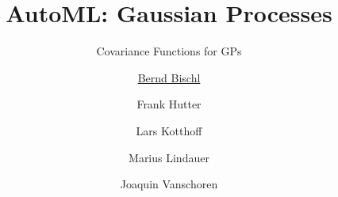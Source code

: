 



\newcommand{\lz}{\vspace{0.5cm}}
\newcommand{\thetab}{\bm{\weights}}
\newcommand{\zero}{\mathbf{0}}
\newcommand{\Xmat}{\mathbf{X}}
\newcommand{\ydat}{\mathbf{y}}
\newcommand{\id}{\boldsymbol{I}}
\newcommand{\Amat}{\mathbf{A}}
\newcommand{\Xspace}{\mathcal{X}}                                           
\newcommand{\Yspace}{\mathcal{Y}}
\newcommand{\ls}{\ell}
\newcommand{\natnum}{\mathbb{N}}
\newcommand{\intnum}{\mathbb{Z}}

\usepackage{fontawesome}
\usepackage{dirtytalk}
\usepackage{csquotes}


\title[AutoML: GPs]{AutoML: Gaussian Processes} %
\subtitle{Covariance Functions for GPs} %
\author[Marius Lindauer]{\underline{Bernd Bischl} \and Frank Hutter \and Lars Kotthoff\newline \and Marius Lindauer \and Joaquin Vanschoren}
\institute{}
\date{}





	
	\maketitle
	

